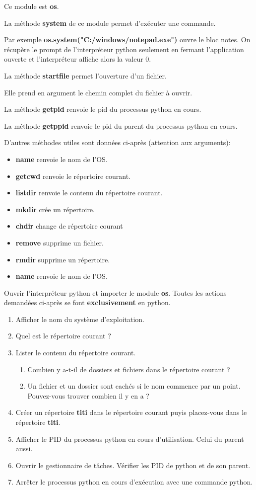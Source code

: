 \documentclass[11pt,a4paper]{article}
\begin{document}
Ce module est \textbf{os}.\medskip

La méthode \textbf{system} de ce module permet d'exécuter une commande. 

Par exemple \textbf{os.system("C:/windows/notepad.exe")} ouvre le bloc notes. On récupère le prompt de l'interpréteur python seulement en fermant l'application ouverte et l'interpréteur affiche alors la valeur 0.\medskip

La méthode \textbf{startfile} permet l'ouverture d'un fichier. 

Elle prend en argument le chemin complet du fichier à ouvrir.\medskip

La méthode \textbf{getpid} renvoie le pid du processus python en cours.

La méthode \textbf{getppid} renvoie le pid du parent du  processus python en cours.\medskip
 
D'autres méthodes utiles sont données ci-après (attention aux arguments):
\begin{itemize}
\item \textbf{name} renvoie le nom de l'OS.
\item \textbf{getcwd} renvoie le répertoire courant.
\item \textbf{listdir} renvoie le contenu du répertoire courant.
\item \textbf{mkdir} crée un répertoire.
\item \textbf{chdir} change de répertoire courant
\item \textbf{remove} supprime un fichier.
\item \textbf{rmdir} supprime un répertoire.
\item \textbf{name} renvoie le nom de l'OS.
\end{itemize}

Ouvrir l'interpréteur python et importer le module \textbf{os}. 
Toutes les actions demandées ci-après se font \textbf{exclusivement} en python.\medskip

\begin{enumerate}
\item Afficher le nom du système d'exploitation.
\item Quel est le répertoire courant ?
\item Lister le contenu du répertoire courant. 
\begin{enumerate}
\item Combien y a-t-il de dossiers et fichiers dans le répertoire courant ?
\item Un fichier et un dossier sont cachés si le nom commence par un point. Pouvez-vous trouver combien il y en a ?
\end{enumerate}
\item Créer un répertoire \textbf{titi} dans le répertoire courant puyis placez-vous dans le répertoire \textbf{titi}.
\item Afficher le PID du processus python en cours d'utilisation. Celui du parent aussi.
\item Ouvrir le gestionnaire de tâches. Vérifier les PID de python et de son parent.
\item Arrêter le processus python en cours d'exécution avec une commande python.
\end{enumerate}
\end{document}
